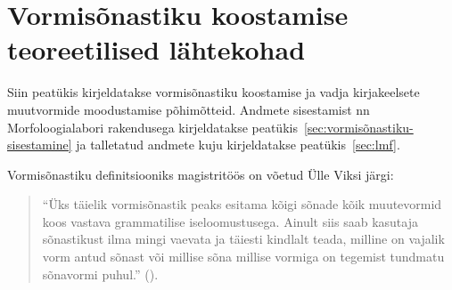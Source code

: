 \documentclass[12pt,a4paper]{article}
\begin{document}










\newpage
\section{Vormisõnastiku koostamise teoreetilised lähtekohad}
\label{teoreetilised-lähtekohad}

Siin peatükis kirjeldatakse vormisõnastiku koostamise ja vadja kirjakeelsete muutvormide moodustamise põhimõtteid. Andmete sisestamist nn Morfoloogia\-labori rakendusega kirjeldatakse peatükis~\ref{sec:vormisõnastiku-sisestamine} ja talletatud andmete kuju kirjeldatakse peatükis~\ref{sec:lmf}.

Vormisõnastiku definitsiooniks magistritöös on võetud Ülle Viksi järgi:

\begin{quote}
  ``Üks täielik vormisõnastik peaks esitama kõigi sõnade kõik muutevormid koos vastava grammatilise iseloomustusega. Ainult siis saab kasutaja sõnastikust ilma mingi vaevata ja täiesti kindlalt teada, milline on vajalik vorm antud sõnast või millise sõna millise vormiga on tegemist tundmatu sõnavormi puhul.'' (\cite[7]{viks_vaike_1992}).
\end{quote}
\end{document}
